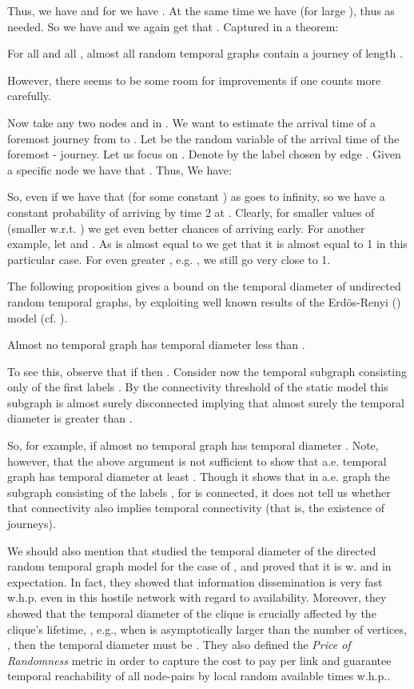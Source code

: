 \documentclass[oribibl, 11pt]{llncs}
\begin{document}
Thus, we have  and for  we have . At the same time we have  (for large ), thus  as needed. So we have  and we again get that . Captured in a theorem:

\begin{theorem}
For all  and all , almost all random temporal graphs contain a journey of length .
\end{theorem}
However, there seems to be some room for improvements if one counts more carefully.

Now take any two nodes  and  in . We want to estimate the arrival time of a foremost journey from  to . Let  be the random variable of the arrival time of the foremost - journey. Let us focus on . Denote by  the label chosen by edge . Given a specific node  we have that . Thus,   We have:


So, even if  we have that  (for some constant ) as  goes to infinity, so we have a constant probability of arriving by time 2 at . Clearly, for smaller values of  (smaller w.r.t. ) we get even better chances of arriving early. For another example, let  and . As  is almost equal to  we get that it is almost equal to 1 in this particular case. For even greater , e.g. , we still go very close to 1.

The following proposition gives a bound on the temporal diameter of undirected random temporal graphs, by exploiting well known results of the Erd\" os-Renyi () model (cf. \cite{Bol01}).

\begin{proposition}
Almost no temporal graph has temporal diameter less than .
\end{proposition}

To see this, observe that if  then . Consider now the temporal subgraph consisting only of the first  labels . By the connectivity threshold of the static  model this subgraph is almost surely disconnected implying that almost surely the temporal diameter is greater than .

So, for example, if  almost no temporal graph has temporal diameter . Note, however, that the above argument is not sufficient to show that a.e. temporal graph has temporal diameter at least . Though it shows that in a.e. graph the subgraph consisting of the labels , for  is connected, it does not tell us whether that connectivity also implies temporal connectivity (that is, the existence of journeys).

We should also mention that \cite{AGMS14} studied the temporal diameter of the directed random temporal graph model for the case of , and proved that it is  w. and in expectation. In fact, they showed that information dissemination is very fast w.h.p. even in this hostile network with regard to availability. Moreover, they showed that the temporal diameter of the clique is crucially affected by the clique's lifetime, , e.g., when  is asymptotically larger than the number of vertices, , then the temporal diameter must be . They also defined the \emph{Price of Randomness} metric in order to capture the cost to pay per link and guarantee temporal reachability of all node-pairs by local random available times w.h.p..
\end{document}
